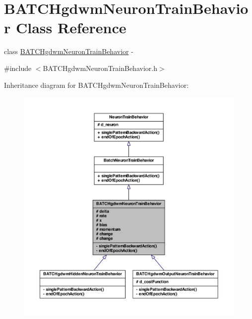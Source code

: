 \hypertarget{class_b_a_t_c_hgdwm_neuron_train_behavior}{
\section{BATCHgdwmNeuronTrainBehavior Class Reference}
\label{class_b_a_t_c_hgdwm_neuron_train_behavior}
}


class \hyperlink{class_b_a_t_c_hgdwm_neuron_train_behavior}{BATCHgdwmNeuronTrainBehavior} -\/  




{\ttfamily \#include $<$BATCHgdwmNeuronTrainBehavior.h$>$}



Inheritance diagram for BATCHgdwmNeuronTrainBehavior:
\nopagebreak
\begin{figure}[H]
\begin{center}
\leavevmode
\includegraphics[width=400pt]{class_b_a_t_c_hgdwm_neuron_train_behavior__inherit__graph}
\end{center}
\end{figure}



